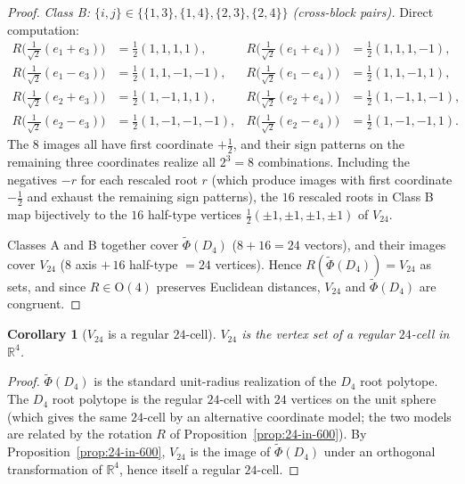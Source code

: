 \documentclass[11pt, a4paper]{amsart}
\newtheorem{corollary}[theorem]{Corollary}
\theoremstyle{definition}
\newcommand{\R}{\mathbb{R}}
\begin{document}
\begin{proof}
\emph{Class B: $\{i, j\} \in \{\{1,3\}, \{1,4\}, \{2,3\}, \{2,4\}\}$
(cross-block pairs).} Direct computation:
\begin{align*}
  R\big(\tfrac{1}{\sqrt 2}(e_1 + e_3)\big) &=
    \tfrac{1}{2}(1, 1, 1, 1), &
  R\big(\tfrac{1}{\sqrt 2}(e_1 + e_4)\big) &=
    \tfrac{1}{2}(1, 1, 1, -1), \\
  R\big(\tfrac{1}{\sqrt 2}(e_1 - e_3)\big) &=
    \tfrac{1}{2}(1, 1, -1, -1), &
  R\big(\tfrac{1}{\sqrt 2}(e_1 - e_4)\big) &=
    \tfrac{1}{2}(1, 1, -1, 1), \\
  R\big(\tfrac{1}{\sqrt 2}(e_2 + e_3)\big) &=
    \tfrac{1}{2}(1, -1, 1, 1), &
  R\big(\tfrac{1}{\sqrt 2}(e_2 + e_4)\big) &=
    \tfrac{1}{2}(1, -1, 1, -1), \\
  R\big(\tfrac{1}{\sqrt 2}(e_2 - e_3)\big) &=
    \tfrac{1}{2}(1, -1, -1, -1), &
  R\big(\tfrac{1}{\sqrt 2}(e_2 - e_4)\big) &=
    \tfrac{1}{2}(1, -1, -1, 1).
\end{align*}
The $8$ images all have first coordinate $+\tfrac{1}{2}$, and their
sign patterns on the remaining three coordinates realize all $2^3
= 8$ combinations. Including the negatives $-r$ for each rescaled
root $r$ (which produce images with first coordinate
$-\tfrac{1}{2}$ and exhaust the remaining sign patterns), the $16$
rescaled roots in Class B map bijectively to the $16$ half-type
vertices $\tfrac{1}{2}(\pm 1, \pm 1, \pm 1, \pm 1)$ of $V_{24}$.

Classes A and B together cover $\tilde\Phi(D_4)$ ($8 + 16 = 24$
vectors), and their images cover $V_{24}$ ($8$ axis $+\, 16$
half-type $= 24$ vertices). Hence $R(\tilde\Phi(D_4)) = V_{24}$
as sets, and since $R \in \mathrm{O}(4)$ preserves Euclidean
distances, $V_{24}$ and $\tilde\Phi(D_4)$ are congruent.
\end{proof}

\begin{corollary}[$V_{24}$ is a regular $24$-cell]
\label{cor:V24-24cell}
$V_{24}$ is the vertex set of a regular $24$-cell in $\R^4$.
\end{corollary}

\begin{proof}
$\tilde\Phi(D_4)$ is the standard unit-radius realization of the
$D_4$ root polytope. The $D_4$ root polytope is the regular
$24$-cell with $24$ vertices on the unit sphere
\cite[\S 22.7]{CoxeterRegularPolytopes} (which gives the same
$24$-cell by an alternative coordinate model; the two models are
related by the rotation $R$ of
Proposition~\ref{prop:24-in-600}). By
Proposition~\ref{prop:24-in-600}, $V_{24}$ is the image of
$\tilde\Phi(D_4)$ under an orthogonal transformation of $\R^4$,
hence itself a regular $24$-cell.
\end{proof}
\end{document}
